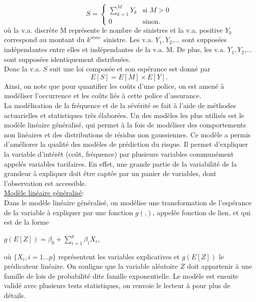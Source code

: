 \documentclass[11pt]{article}
\begin{document}
\begin{equation}
S = \left\{
    \begin{array}{ll}
        \sum_{k=1}^{M} Y_{k} & \mbox{si } M>0 \\
        0 & \mbox{sinon.}
    \end{array}
\right. \nonumber
\end{equation}
où la v.a. discrète M représente le nombre de sinistres et la v.a. positive $Y_{k}$ correspond au montant du $k^{ième}$ sinistre. Les v.a. $Y_{1}, Y_{2}$,... sont supposées indépendantes entre elles et indépendantes de la v.a. M. De plus, les v.a.  $Y_{1}, Y_{2}$,... sont supposées identiquement distribuées.\\
Donc la v.a. $S$ suit une loi composée et son espérance est donné par
\begin{equation}
E[S]=E[M]\times E[Y]. \nonumber
\end{equation}
Ainsi, on note que pour quantifier les coûts d'une police, on est amené à modéliser l'occurrence et les coûts liés à cette police d'assurance.\\
La modélisation de la fréquence et de la sévérité se fait à l'aide de méthodes actuarielles et statistiques très élaborées. Un des modèles les plus utilisés est le modèle linéaire généralisé, qui permet à la fois de modéliser des comportements non linéaires et des distributions de résidus non gaussiennes. Ce modèle a permis d'améliorer la qualité des modèles de prédiction du risque. Il permet d'expliquer la variable d'intérêt (coût, fréquence) par plusieurs variables communément appelés variables tarifaires. En effet, une grande partie de la variabilité de la grandeur à expliquer doit être captée par un panier de variables, dont l'observation est accessible. \\

\underline{Modèle linéaire généralisé}:\\
Dans le modèle linéaire généralisé, on modélise une transformation  de l'espérance de la variable à expliquer par une fonction $g(.)$, appelée fonction de lien, et qui est de la forme 
\begin{center}
$g(E[Z])= \beta_{0} + \sum_{i=1}^{p} \beta_{i}X_{i}$,
\end{center}
où $\{X_i, i=1...p\}$ représentent les variables explicatives et $g(E[Z])$ le prédicateur linéaire. On souligne que la variable aléatoire $Z$ doit appartenir à une famille de lois de probabilité dite famille exponentielle. Le modèle est ensuite validé avec plusieurs tests statistiques, on renvoie le lecteur à \cite{mccullagh1984generalized} pour plus de détails.\\
\end{document}
